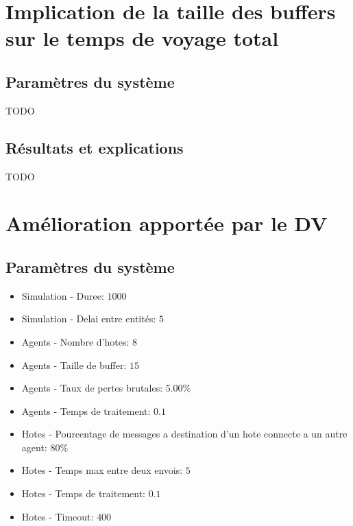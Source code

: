 \documentclass[a4paper,11pt]{article}
\begin{document}
\section{Implication de la taille des buffers sur le temps de voyage total}
\subsection{Paramètres du système}
TODO

\subsection{Résultats et explications}
TODO









\section{Amélioration apportée par le DV}
\subsection{Paramètres du système}
\begin{itemize}
 \item Simulation - Duree: $1000$
 \item Simulation - Delai entre entités: $5$
 \item Agents - Nombre d'hotes: $8$
 \item Agents - Taille de buffer: $15$
 \item Agents - Taux de pertes brutales: $5.00$\%
 \item Agents - Temps de traitement: $0.1$
 \item Hotes - Pourcentage de messages a destination d'un hote connecte a un autre agent: $80$\%
 \item Hotes - Temps max entre deux envois: $5$
 \item Hotes - Temps de traitement: $0.1$
 \item Hotes - Timeout: $400$
\end{itemize}
\end{document}
